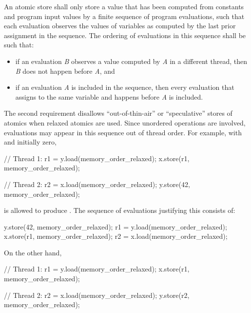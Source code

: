 \pnum
An atomic store shall only store a value that has been computed from constants and
program input values by a finite sequence of program evaluations, such that each
evaluation observes the values of variables as computed by the last prior assignment in
the sequence. The ordering of evaluations in this sequence shall be such that:

\begin{itemize}
\item if an evaluation \textit{B} observes a value computed by \textit{A} in a
different thread, then \textit{B} does not happen before \textit{A}, and

\item if an evaluation \textit{A} is included in the sequence, then every
evaluation that assigns to the same variable and happens before \textit{A} is
included.
\end{itemize}

\pnum
\enternote The second requirement disallows ``out-of-thin-air'' or ``speculative'' stores of atomics when relaxed atomics are used. Since unordered operations are involved, evaluations may appear in this sequence out of thread order. For example, with  and  initially zero,

\begin{codeblock}
// Thread 1:
r1 = y.load(memory_order_relaxed);
x.store(r1, memory_order_relaxed);
\end{codeblock}

\begin{codeblock}
// Thread 2:
r2 = x.load(memory_order_relaxed);
y.store(42, memory_order_relaxed);
\end{codeblock}

is allowed to produce . The sequence of evaluations justifying this consists of:

\begin{codeblock}
y.store(42, memory_order_relaxed);
r1 = y.load(memory_order_relaxed);
x.store(r1, memory_order_relaxed);
r2 = x.load(memory_order_relaxed);
\end{codeblock}

On the other hand,

\begin{codeblock}
// Thread 1:
r1 = y.load(memory_order_relaxed);
x.store(r1, memory_order_relaxed);
\end{codeblock}

\begin{codeblock}
// Thread 2:
r2 = x.load(memory_order_relaxed);
y.store(r2, memory_order_relaxed);
\end{codeblock}

